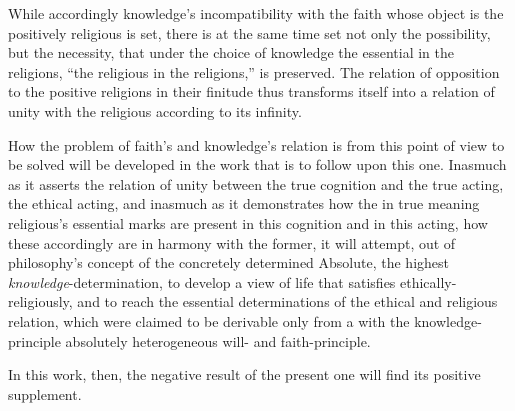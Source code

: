 \documentclass[12pt,a4paper]{book}
\begin{document}
While accordingly knowledge's incompatibility with the faith whose object is the positively
religious is set, there is at the same time set not only the possibility, but the necessity, that
under the choice of knowledge the essential in the religions, ``the religious in the religions,''
is preserved. The relation of opposition to the positive religions in their finitude thus transforms
itself into a relation of unity with the religious according to its infinity.

How the problem of faith's and knowledge's relation is from this point of view to be solved will be
developed in the work that is to follow upon this one. Inasmuch as it asserts the relation of unity
between the true cognition and the true acting, the ethical acting, and inasmuch as it demonstrates
how the in true meaning religious's essential marks are present in this cognition and in this acting,
how these accordingly are in harmony with the former, it will attempt, out of philosophy's concept of
the concretely determined Absolute, the highest \emph{knowledge}-determination, to develop a view of
life that satisfies ethically-religiously, and to reach the essential determinations of the ethical
and religious relation, which were claimed to be derivable only from a with the knowledge-principle
absolutely heterogeneous will- and faith-principle.

In this work, then, the negative result of the
present one will find its positive supplement.
\end{document}
